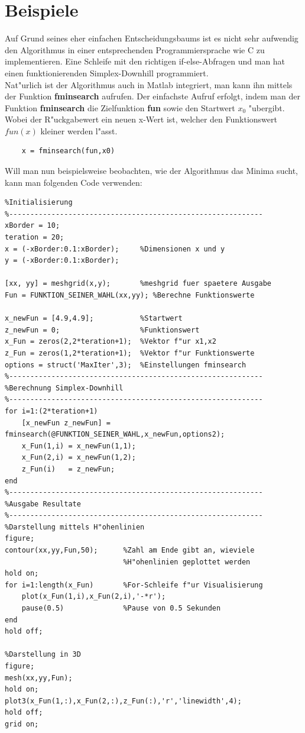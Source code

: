 \section{Beispiele}
Auf Grund seines eher einfachen Entscheidungsbaums ist es nicht sehr aufwendig den Algorithmus in einer entsprechenden Programmiersprache wie C zu implementieren. Eine Schleife mit den richtigen if-else-Abfragen und man hat einen funktionierenden Simplex-Downhill programmiert.\\
Nat"urlich ist der Algorithmus auch in Matlab integriert, man kann ihn mittels der Funktion \textbf{fminsearch} aufrufen. 
Der einfachste Aufruf erfolgt, indem man der Funktion \textbf{fminsearch} die Zielfunktion \textbf{fun} sowie den Startwert \textbf{$x_0$} "ubergibt. Wobei der R"uckgabewert ein neuen x-Wert ist, welcher den Funktionswert $fun(x)$ kleiner werden l"asst. 
\begin{lstlisting}
	x = fminsearch(fun,x0)
\end{lstlisting} 
Will man nun beispielsweise beobachten, wie der Algorithmus das Minima sucht, kann man folgenden Code verwenden: 
\newpage
\begin{lstlisting}[style=Matlab]
%------------------------------------------------------------
%Initialisierung
%------------------------------------------------------------
xBorder = 10; 
teration = 20; 
x = (-xBorder:0.1:xBorder);     %Dimensionen x und y
y = (-xBorder:0.1:xBorder); 

[xx, yy] = meshgrid(x,y);       %meshgrid fuer spaetere Ausgabe
Fun = FUNKTION_SEINER_WAHL(xx,yy); %Berechne Funktionswerte

x_newFun = [4.9,4.9];           %Startwert
z_newFun = 0;                   %Funktionswert
x_Fun = zeros(2,2*teration+1);  %Vektor f"ur x1,x2
z_Fun = zeros(1,2*teration+1);  %Vektor f"ur Funktionswerte
options = struct('MaxIter',3);  %Einstellungen fminsearch
%------------------------------------------------------------
%Berechnung Simplex-Downhill
%------------------------------------------------------------
for i=1:(2*teration+1)
	[x_newFun z_newFun] = fminsearch(@FUNKTION_SEINER_WAHL,x_newFun,options2);
	x_Fun(1,i) = x_newFun(1,1);
	x_Fun(2,i) = x_newFun(1,2); 
	z_Fun(i)   = z_newFun; 
end
%------------------------------------------------------------
%Ausgabe Resultate
%------------------------------------------------------------
%Darstellung mittels H"ohenlinien
figure; 
contour(xx,yy,Fun,50);      %Zahl am Ende gibt an, wieviele 
                            %H"ohenlinien geplottet werden
hold on; 
for i=1:length(x_Fun)       %For-Schleife f"ur Visualisierung
    plot(x_Fun(1,i),x_Fun(2,i),'-*r'); 
    pause(0.5)              %Pause von 0.5 Sekunden
end
hold off; 

%Darstellung in 3D
figure; 
mesh(xx,yy,Fun);
hold on; 
plot3(x_Fun(1,:),x_Fun(2,:),z_Fun(:),'r','linewidth',4); 
hold off; 
grid on; 
\end{lstlisting}
